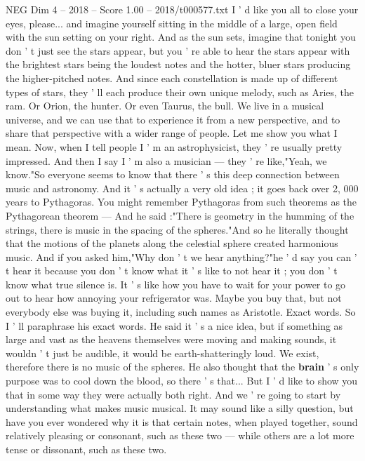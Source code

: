 \begin{textsample}{NEG Dim 4 – 2018 – Score 1.00 – 2018/t000577.txt}  \label{ex:f4_neg_019}
I ' d like you all to close your eyes, please... and imagine yourself sitting in the middle of a large, open field with the sun setting on your right.
And as the sun sets, imagine that tonight you don ' t just see the stars appear, but you ' re able to hear the stars appear with the brightest stars being the loudest notes and the hotter, bluer stars producing the higher-pitched notes.
And since each constellation is made up of different types of stars, they ' ll each produce their own unique melody, such as Aries, the ram.
Or Orion, the hunter.
Or even Taurus, the bull.
We live in a musical universe, and we can use that to experience it from a new perspective, and to share that perspective with a wider range of people.
Let me show you what I mean.
Now, when I tell people I ' m an astrophysicist, they ' re usually pretty impressed.
And then I say I ' m also a musician — they ' re like,"Yeah, we know."So everyone seems to know that there ' s this deep connection between music and astronomy.
And it ' s actually a very old idea ; it goes back over 2, 000 years to Pythagoras.
You might remember Pythagoras from such theorems as the Pythagorean theorem — And he said :"There is geometry in the humming of the strings, there is music in the spacing of the spheres."And so he literally thought that the motions of the planets along the celestial sphere created harmonious music.
And if you asked him,"Why don ' t we hear anything?"he ' d say you can ' t hear it because you don ' t know what it ' s like to not hear it ; you don ' t know what true silence is.
It ' s like how you have to wait for your power to go out to hear how annoying your refrigerator was.
Maybe you buy that, but not everybody else was buying it, including such names as Aristotle.
Exact words.
So I ' ll paraphrase his exact words.
He said it ' s a nice idea, but if something as large and vast as the heavens themselves were moving and making sounds, it wouldn ' t just be audible, it would be earth-shatteringly loud.
We exist, therefore there is no music of the spheres.
He also thought that the \textbf{brain} ' s only purpose was to cool down the blood, so there ' s that...
But I ' d like to show you that in some way they were actually both right.
And we ' re going to start by understanding what makes music musical.
It may sound like a silly question, but have you ever wondered why it is that certain notes, when played together, sound relatively pleasing or consonant, such as these two — while others are a lot more tense or dissonant, such as these two.

\end{textsample}

